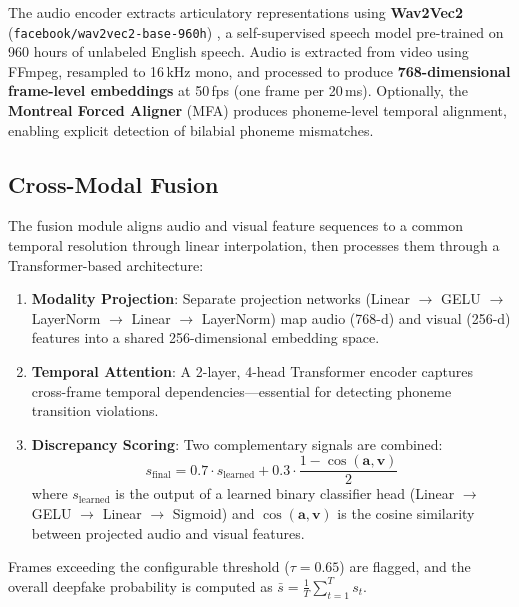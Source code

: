 \documentclass[11pt,a4paper]{article}
\begin{document}
The audio encoder extracts articulatory representations using \textbf{Wav2Vec2} (\texttt{facebook/wav2vec2-base-960h}) \citep{baevski2020wav2vec}, a self-supervised speech model pre-trained on 960 hours of unlabeled English speech. Audio is extracted from video using FFmpeg, resampled to 16\,kHz mono, and processed to produce \textbf{768-dimensional frame-level embeddings} at 50\,fps (one frame per 20\,ms). Optionally, the \textbf{Montreal Forced Aligner} (MFA) produces phoneme-level temporal alignment, enabling explicit detection of bilabial phoneme mismatches.

\subsection{Cross-Modal Fusion}

The fusion module aligns audio and visual feature sequences to a common temporal resolution through linear interpolation, then processes them through a Transformer-based architecture:

\begin{enumerate}[leftmargin=2em]
    \item \textbf{Modality Projection}: Separate projection networks (Linear $\rightarrow$ GELU $\rightarrow$ LayerNorm $\rightarrow$ Linear $\rightarrow$ LayerNorm) map audio (768-d) and visual (256-d) features into a shared 256-dimensional embedding space.

    \item \textbf{Temporal Attention}: A 2-layer, 4-head Transformer encoder captures cross-frame temporal dependencies---essential for detecting phoneme transition violations.

    \item \textbf{Discrepancy Scoring}: Two complementary signals are combined:
    \begin{equation}
        s_{\text{final}} = 0.7 \cdot s_{\text{learned}} + 0.3 \cdot \frac{1 - \cos(\mathbf{a}, \mathbf{v})}{2}
    \end{equation}
    where $s_{\text{learned}}$ is the output of a learned binary classifier head (Linear $\rightarrow$ GELU $\rightarrow$ Linear $\rightarrow$ Sigmoid) and $\cos(\mathbf{a}, \mathbf{v})$ is the cosine similarity between projected audio and visual features.
\end{enumerate}

Frames exceeding the configurable threshold ($\tau = 0.65$) are flagged, and the overall deepfake probability is computed as $\bar{s} = \frac{1}{T}\sum_{t=1}^{T} s_t$.
\end{document}
